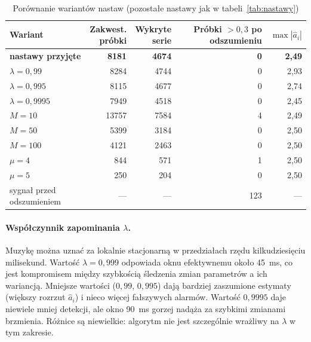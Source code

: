 \documentclass[11pt,a4paper]{article}
\begin{document}
\begin{table}[H]
  \centering
  \caption{Porównanie wariantów nastaw (pozostałe nastawy jak w tabeli~\ref{tab:nastawy})}
  \label{tab:porownanie}
  \begin{tabular}{lrrrr}
    \toprule
    Wariant & \makecell{Zakwest.\\próbki} & \makecell{Wykryte\\serie} &
      \makecell{Próbki $>0{,}3$\\po odszumieniu} & $\max|\hat a_i|$ \\
    \midrule
    \textbf{nastawy przyjęte} & \textbf{8181} & \textbf{4674} & \textbf{0} & \textbf{2,49} \\
    $\lambda = 0{,}99$        & 8284  & 4744 & 0 & 2,93 \\
    $\lambda = 0{,}995$       & 8115  & 4677 & 0 & 2,74 \\
    $\lambda = 0{,}9995$      & 7949  & 4518 & 0 & 2,45 \\
    $M = 10$                  & 13757 & 7584 & 4 & 2,49 \\
    $M = 50$                  & 5399  & 3184 & 0 & 2,50 \\
    $M = 100$                 & 4121  & 2463 & 0 & 2,50 \\
    $\mu = 4$                 & 844   & 571  & 1 & 2,50 \\
    $\mu = 5$                 & 250   & 204  & 0 & 2,50 \\
    \midrule
    sygnał przed odszumieniem & ---   & ---  & 123 & --- \\
    \bottomrule
  \end{tabular}
\end{table}

\paragraph{Współczynnik zapominania $\lambda$.}
Muzykę można uznać za lokalnie stacjonarną w przedziałach rzędu
kilkudziesięciu milisekund. Wartość $\lambda = 0{,}999$ odpowiada oknu
efektywnemu około 45~ms, co jest kompromisem między szybkością śledzenia
zmian parametrów a ich wariancją. Mniejsze wartości ($0{,}99$, $0{,}995$)
dają bardziej zaszumione estymaty (większy rozrzut $\hat a_i$) i nieco więcej
fałszywych alarmów. Wartość $0{,}9995$ daje niewiele mniej detekcji, ale
okno 90~ms gorzej nadąża za szybkimi zmianami brzmienia. Różnice są
niewielkie: algorytm nie jest szczególnie wrażliwy na $\lambda$ w tym
zakresie.
\end{document}
